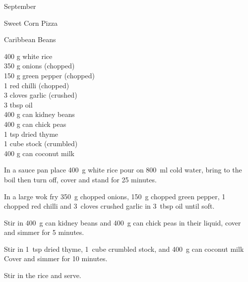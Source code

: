 \begin{menu}{September}
\begin{recipe}{2}{Sweet Corn Pizza}
\begin{instructions}
    \end{instructions}
    \end{recipe}%
  
    \begin{recipe}{2}{Caribbean Beans}%
		\begin{ingredients}
		400 g white rice  \\
	350 g onions (chopped) \\
	150 g green pepper (chopped) \\
	1  red chilli (chopped) \\
	3 cloves garlic (crushed) \\
	3 tbsp oil  \\
	400 g can kidney beans  \\
	400 g can chick peas  \\
	1 tsp dried thyme  \\
	1 cube stock (crumbled) \\
	400 g can coconut milk  \\
	
		\end{ingredients}
	
	
    \begin{instructions}
    \item 
    In a
    sauce pan
    place
    400~g  white rice
    pour on
    800~ml  cold water,
    bring to the boil then turn off, cover and stand for 25 minutes.
  \item 
        In a large wok fry
        350~g chopped onions,
        150~g chopped green pepper,
        1~ chopped red chilli
        and
        3~cloves crushed garlic
        in
        3~tbsp  oil
        until soft.
      \item 
        Stir in
        400~g  can kidney beans
        and
        400~g  can chick peas
        in their liquid,
        cover and simmer for 5 minutes.
      \item 
        Stir in
        1~tsp  dried thyme,
        1~cube crumbled stock,
        and
        400~g  can coconut milk
        Cover and simmer for 10 minutes.
      \item 
        Stir in the rice and serve.
      
    \end{instructions}
    \end{recipe}%
  

\end{menu}
